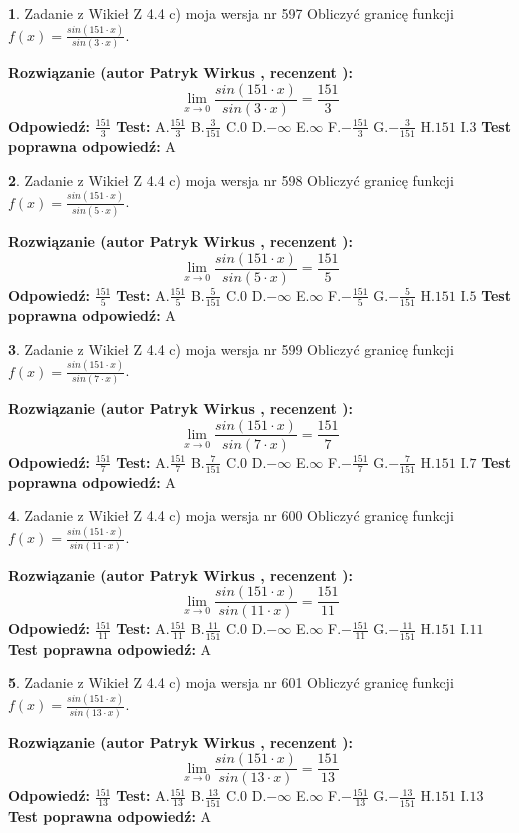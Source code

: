 \documentclass[12pt, a4paper]{article}
\theoremstyle{definition} %
\newtheorem{zad}{}
\newcommand{\zadStart}[1]{\begin{zad}#1\newline}
\newcommand{\zadStop}{\end{zad}}
\newcommand{\rozwStart}[2]{\noindent \textbf{Rozwiązanie (autor #1 , recenzent #2): }\newline}
\newcommand{\rozwStop}{\newline}
\newcommand{\odpStart}{\noindent \textbf{Odpowiedź:}\newline}
\newcommand{\odpStop}{\newline}
\newcommand{\testStart}{\noindent \textbf{Test:}\newline}
\newcommand{\testStop}{\newline}
\newcommand{\kluczStart}{\noindent \textbf{Test poprawna odpowiedź:}\newline}
\newcommand{\kluczStop}{\newline}
\begin{document}
\zadStart{Zadanie z Wikieł Z 4.4 c) moja wersja nr 597}
Obliczyć granicę funkcji $f(x)=\frac{sin(151\cdot x)}{sin(3\cdot x)}$.
\zadStop
\rozwStart{Patryk Wirkus}{}
$$\lim\limits_{x\to 0}\frac{sin(151\cdot x)}{sin(3\cdot x)}=
\frac{151}{3}$$
\rozwStop
\odpStart
$\frac{151}{3}$
\odpStop
\testStart
A.$\frac{151}{3}$
B.$\frac{3}{151}$
C.$0$
D.$-\infty$
E.$\infty$
F.$-\frac{151}{3}$
G.$-\frac{3}{151}$
H.$151$
I.$3$
\testStop
\kluczStart
A
\kluczStop



\zadStart{Zadanie z Wikieł Z 4.4 c) moja wersja nr 598}
Obliczyć granicę funkcji $f(x)=\frac{sin(151\cdot x)}{sin(5\cdot x)}$.
\zadStop
\rozwStart{Patryk Wirkus}{}
$$\lim\limits_{x\to 0}\frac{sin(151\cdot x)}{sin(5\cdot x)}=
\frac{151}{5}$$
\rozwStop
\odpStart
$\frac{151}{5}$
\odpStop
\testStart
A.$\frac{151}{5}$
B.$\frac{5}{151}$
C.$0$
D.$-\infty$
E.$\infty$
F.$-\frac{151}{5}$
G.$-\frac{5}{151}$
H.$151$
I.$5$
\testStop
\kluczStart
A
\kluczStop



\zadStart{Zadanie z Wikieł Z 4.4 c) moja wersja nr 599}
Obliczyć granicę funkcji $f(x)=\frac{sin(151\cdot x)}{sin(7\cdot x)}$.
\zadStop
\rozwStart{Patryk Wirkus}{}
$$\lim\limits_{x\to 0}\frac{sin(151\cdot x)}{sin(7\cdot x)}=
\frac{151}{7}$$
\rozwStop
\odpStart
$\frac{151}{7}$
\odpStop
\testStart
A.$\frac{151}{7}$
B.$\frac{7}{151}$
C.$0$
D.$-\infty$
E.$\infty$
F.$-\frac{151}{7}$
G.$-\frac{7}{151}$
H.$151$
I.$7$
\testStop
\kluczStart
A
\kluczStop



\zadStart{Zadanie z Wikieł Z 4.4 c) moja wersja nr 600}
Obliczyć granicę funkcji $f(x)=\frac{sin(151\cdot x)}{sin(11\cdot x)}$.
\zadStop
\rozwStart{Patryk Wirkus}{}
$$\lim\limits_{x\to 0}\frac{sin(151\cdot x)}{sin(11\cdot x)}=
\frac{151}{11}$$
\rozwStop
\odpStart
$\frac{151}{11}$
\odpStop
\testStart
A.$\frac{151}{11}$
B.$\frac{11}{151}$
C.$0$
D.$-\infty$
E.$\infty$
F.$-\frac{151}{11}$
G.$-\frac{11}{151}$
H.$151$
I.$11$
\testStop
\kluczStart
A
\kluczStop



\zadStart{Zadanie z Wikieł Z 4.4 c) moja wersja nr 601}
Obliczyć granicę funkcji $f(x)=\frac{sin(151\cdot x)}{sin(13\cdot x)}$.
\zadStop
\rozwStart{Patryk Wirkus}{}
$$\lim\limits_{x\to 0}\frac{sin(151\cdot x)}{sin(13\cdot x)}=
\frac{151}{13}$$
\rozwStop
\odpStart
$\frac{151}{13}$
\odpStop
\testStart
A.$\frac{151}{13}$
B.$\frac{13}{151}$
C.$0$
D.$-\infty$
E.$\infty$
F.$-\frac{151}{13}$
G.$-\frac{13}{151}$
H.$151$
I.$13$
\testStop
\kluczStart
A
\kluczStop
\end{document}

